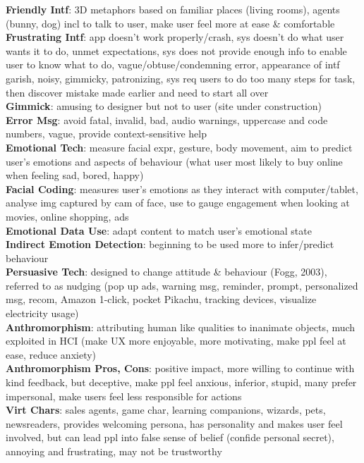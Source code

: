\documentclass[a4paper]{article}
\begin{document}
\begin{multicols}{3}
        \textbf{Friendly Intf}: 3D metaphors based on familiar places (living rooms), agents (bunny, dog) incl to talk to user, make user feel more at ease \& comfortable\\
        \textbf{Frustrating Intf}: app doesn't work properly/crash, sys doesn't do what user wants it to do, unmet expectations, sys does not provide enough info to enable user to know what to do, vague/obtuse/condemning error, appearance of intf garish, noisy, gimmicky, patronizing, sys req users to do too many steps for task, then discover mistake made earlier and need to start all over\\
        \textbf{Gimmick}: amusing to designer but not to user (site under construction)\\
        \textbf{Error Msg}: avoid fatal, invalid, bad, audio warnings, uppercase and code numbers, vague, provide context-sensitive help\\
        \textbf{Emotional Tech}: measure facial expr, gesture, body movement, aim to predict user's emotions and aspects of behaviour (what user most likely to buy online when feeling sad, bored, happy)\\
        \textbf{Facial Coding}: measures user's emotions as they interact with computer/tablet, analyse img captured by cam of face, use to gauge engagement when looking at movies, online shopping, ads\\
        \textbf{Emotional Data Use}: adapt content to match user's emotional state\\
        \textbf{Indirect Emotion Detection}: beginning to be used more to infer/predict behaviour\\
        \textbf{Persuasive Tech}: designed to change attitude \& behaviour (Fogg, 2003), referred to as nudging (pop up ads, warning msg, reminder, prompt, personalized msg, recom, Amazon 1-click, pocket Pikachu, tracking devices, visualize electricity usage)\\
        \textbf{Anthromorphism}: attributing human like qualities to inanimate objects, much exploited in HCI (make UX more enjoyable, more motivating, make ppl feel at ease, reduce anxiety)\\
        \textbf{Anthromorphism Pros, Cons}: positive impact, more willing to continue with kind feedback, but deceptive, make ppl feel anxious, inferior, stupid, many prefer impersonal, make users feel less responsible for actions\\
        \textbf{Virt Chars}: sales agents, game char, learning companions, wizards, pets, newsreaders, provides welcoming persona, has personality and makes user feel involved, but can lead ppl into false sense of belief (confide personal secret), annoying and frustrating, may not be trustworthy\\

\end{multicols}
\end{document}
